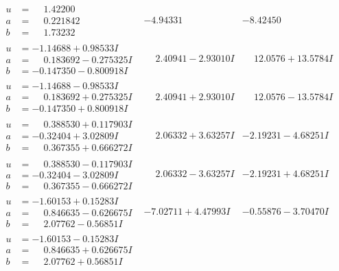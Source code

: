 \documentclass[1p]{elsarticle_modified}
\theoremstyle{definition}
\begin{document}
$$\begin{array}{c|c|c}
\begin{aligned}
u &= \phantom{-}1.42200\phantom{ +0.000000I} \\
a &= \phantom{-}0.221842\phantom{ +0.000000I} \\
b &= \phantom{-}1.73232\phantom{ +0.000000I}\end{aligned}
 & -4.94331\phantom{ +0.000000I} & -8.42450\phantom{ +0.000000I} \\ \hline\begin{aligned}
u &= -1.14688 + 0.98533 I \\
a &= \phantom{-}0.183692 - 0.275325 I \\
b &= -0.147350 - 0.800918 I\end{aligned}
 & \phantom{-}2.40941 - 2.93010 I & \phantom{-}12.0576 + 13.5784 I \\ \hline\begin{aligned}
u &= -1.14688 - 0.98533 I \\
a &= \phantom{-}0.183692 + 0.275325 I \\
b &= -0.147350 + 0.800918 I\end{aligned}
 & \phantom{-}2.40941 + 2.93010 I & \phantom{-}12.0576 - 13.5784 I \\ \hline\begin{aligned}
u &= \phantom{-}0.388530 + 0.117903 I \\
a &= -0.32404 + 3.02809 I \\
b &= \phantom{-}0.367355 + 0.666272 I\end{aligned}
 & \phantom{-}2.06332 + 3.63257 I & -2.19231 - 4.68251 I \\ \hline\begin{aligned}
u &= \phantom{-}0.388530 - 0.117903 I \\
a &= -0.32404 - 3.02809 I \\
b &= \phantom{-}0.367355 - 0.666272 I\end{aligned}
 & \phantom{-}2.06332 - 3.63257 I & -2.19231 + 4.68251 I \\ \hline\begin{aligned}
u &= -1.60153 + 0.15283 I \\
a &= \phantom{-}0.846635 - 0.626675 I \\
b &= \phantom{-}2.07762 - 0.56851 I\end{aligned}
 & -7.02711 + 4.47993 I & -0.55876 - 3.70470 I \\ \hline\begin{aligned}
u &= -1.60153 - 0.15283 I \\
a &= \phantom{-}0.846635 + 0.626675 I \\
b &= \phantom{-}2.07762 + 0.56851 I\end{aligned}

\end{array}$$
\end{document}
